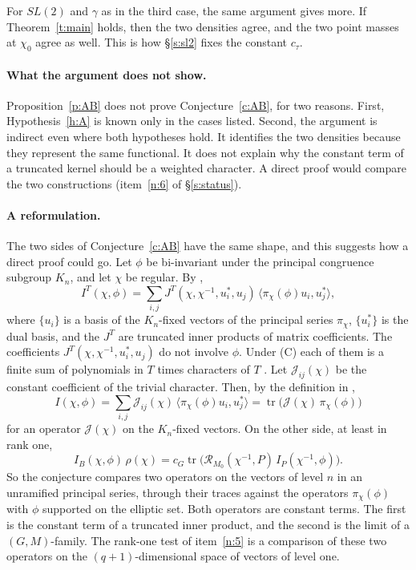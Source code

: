 \documentclass[12pt,letterpaper]{article}
\numberwithin{equation}{section}
\theoremstyle{plain}
\theoremstyle{definition}
\theoremstyle{remark}
\newcommand{\ip}[1]{\langle #1\rangle}
\DeclareMathOperator{\tr}{tr}
\begin{document}
For $SL(2)$ and $\gamma$ as in the third case, the same argument gives more. If Theorem~\ref{t:main} holds, then the two densities agree, and the two point masses at $\chi_0$ agree as well. This is how \S\ref{s:sl2} fixes the constant $c_\tau$.

\paragraph{What the argument does not show.} Proposition~\ref{p:AB} does not prove Conjecture~\ref{c:AB}, for two reasons. First, Hypothesis~\ref{h:A} is known only in the cases listed. Second, the argument is indirect even where both hypotheses hold. It identifies the two densities because they represent the same functional. It does not explain why the constant term of a truncated kernel should be a weighted character. A direct proof would compare the two constructions (item~\ref{n:6} of \S\ref{s:status}).

\paragraph{A reformulation.} The two sides of Conjecture~\ref{c:AB} have the same shape, and this suggests how a direct proof could go. Let $\phi$ be bi-invariant under the principal congruence subgroup $K_n$, and let $\chi$ be regular. By \cite[Prop.~4.2(a)]{JC26},
\[
I^T(\chi,\phi)=\sum_{i,j}J^T(\chi,\chi^{-1},u_i^*,u_j)\,\ip{\pi_\chi(\phi)u_i,u_j^*},
\]
where $\{u_i\}$ is a basis of the $K_n$-fixed vectors of the principal series $\pi_\chi$, $\{u_i^*\}$ is the dual basis, and the $J^T$ are truncated inner products of matrix coefficients. The coefficients $J^T(\chi,\chi^{-1},u_i^*,u_j)$ do not involve $\phi$. Under (C) each of them is a finite sum of polynomials in $T$ times characters of $T$ \cite[Prop.~3.6]{JC26}. Let $\mathcal J_{ij}(\chi)$ be the constant coefficient of the trivial character. Then, by the definition in \cite[Prop.~4.2(c)]{JC26},
\[
I(\chi,\phi)=\sum_{i,j}\mathcal J_{ij}(\chi)\,\ip{\pi_\chi(\phi)u_i,u_j^*}=\tr\big(\mathcal J(\chi)\,\pi_\chi(\phi)\big)
\]
for an operator $\mathcal J(\chi)$ on the $K_n$-fixed vectors. On the other side, at least in rank one,
\[
I_B(\chi,\phi)\,\rho(\chi)=c_G\tr\big(\mathcal R_{M_0}(\chi^{-1},P)\,I_P(\chi^{-1},\phi)\big).
\]
So the conjecture compares two operators on the vectors of level $n$ in an unramified principal series, through their traces against the operators $\pi_\chi(\phi)$ with $\phi$ supported on the elliptic set. Both operators are constant terms. The first is the constant term of a truncated inner product, and the second is the limit of a $(G,M)$-family. The rank-one test of item~\ref{n:5} is a comparison of these two operators on the $(q+1)$-dimensional space of vectors of level one.
\end{document}
